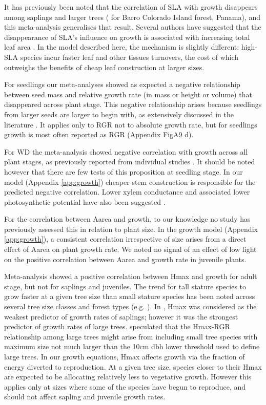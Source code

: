 \documentclass[a4paper]{article}\usepackage[]{graphicx}\usepackage[]{color}
\begin{document}
It has previously been noted that the correlation of SLA with growth disappears among saplings and larger trees (\citealt{Wright:2010tp} for Barro Colorado Island forest, Panama), and this meta-analysis generalises that result. Several authors have suggested that the disappearance of SLA's influence on growth is associated with increasing total leaf area \citep{Reich:1992wm,Poorter:2008iu,Wright:2010tp}. In the model described here, the mechanism is slightly different: high-SLA species incur faster leaf and other tissues turnovers, the cost of which outweighs the benefits of cheap leaf construction at larger sizes.

For seedlings our meta-analyses showed as expected a negative relationship between seed mass and relative growth rate (in mass or height or volume) that disappeared across plant stage. This negative relationship arises because seedlings from larger seeds are larger to begin with, as extensively discussed in the literature \citep[reviewed by][]{Turnbull:2012ew}. It applies only to RGR not to absolute growth rate, but for seedlings growth is most often reported as RGR (Appendix FigA9 d).

For WD the meta-analysis showed negative correlation with growth across all plant stages, as previously reported from individual studies \citep{Wright:2010tp,Ruger:2012jv}. It should be noted however that there are few tests of this proposition at seedling stage. In our model (Appendix \ref{app:growth}) cheaper stem construction is responsible for the predicted negative correlation. Lower xylem conductance and associated lower photosynthetic potential have also been suggested \citep[reviewed by][]{Chave:2009iy}. 

For the correlation between Aarea and growth, to our knowledge no study has previously assessed this in relation to plant size. In the growth model (Appendix \ref{app:growth}), a consistent correlation irrespective of size arises from a direct effect of Aarea on plant growth rate. We noted no signal of an effect of low light on the positive correlation between Aarea and growth rate in juvenile plants.

Meta-analysis showed a positive correlation between Hmax and growth for adult stage, but not for saplings and juveniles. The trend for tall stature species to grow faster at a given tree size than small stature species has been noted across several tree size classes and forest types (e.g. \citealt{Poorter:2008iu,Wright:2010tp,Herault:2011dd,Ruger:2012jv,Iida:2014ep}). In \citet{Wright:2010tp}, Hmax was considered as the weakest predictor of growth rates of saplings; however it was the strongest predictor of growth rates of large trees. \citet{Poorter:2008iu} speculated that the Hmax-RGR relationship among large trees might arise from including small tree species with maximum size not much larger than the  10cm dbh lower threshold used to define large trees. In our growth equations, Hmax affects growth via the fraction of energy diverted to reproduction. At a given tree size, species closer to their Hmax are expected to be allocating relatively less to vegetative growth. However this applies only at sizes where some of the species have begun to reproduce, and should not affect sapling and juvenile growth rates. 
\end{document}
